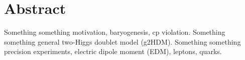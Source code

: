 \chapter{Abstract}
\label{ch:abstract}
Something something motivation, baryogenesis, cp violation. 
Something something general two-Higgs doublet model (g2HDM). 
Something something precision experiments, electric dipole moment (EDM), leptons, quarks. 
